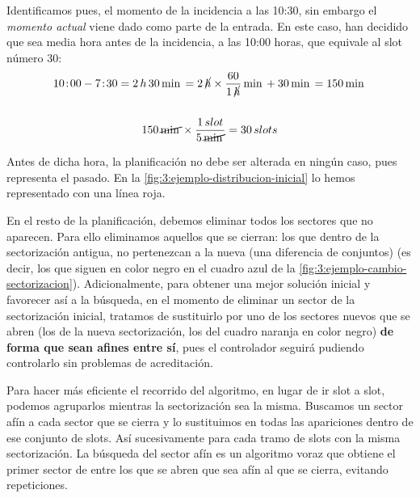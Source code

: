 Identificamos pues, el momento de la incidencia a las 10:30, sin embargo el \textit{momento actual} viene dado como parte de la entrada. En este caso, han decidido que sea media hora antes de la incidencia, a las 10:00 horas, que equivale al slot número 30:
\begin{gather*}
10\!:\!00 - 7\!:\!30 = 2 \,h \,30 \,\min = 2 \, \cancel{h} \times \frac{60}{1 \,\cancel{h}}\,\min + 30\,\min = 150\,\min\\\\
150 \,\cancel{\min} \times \frac{1\,slot}{5\,\cancel{\min}} = 30\,slots
\end{gather*}

Antes de dicha hora, la planificación no debe ser alterada en ningún caso, pues representa el pasado. En la 
\autoref{fig:3:ejemplo-distribucion-inicial} lo hemos representado con una línea roja. 

En el resto de la planificación, debemos eliminar todos los sectores que no aparecen. Para ello eliminamos aquellos que se cierran: los que dentro de la sectorización antigua, no pertenezcan a la nueva (una diferencia de conjuntos) (es decir, los que siguen en color negro en el cuadro azul de la \autoref{fig:3:ejemplo-cambio-sectorizacion}). 
Adicionalmente, para obtener una mejor solución inicial y favorecer así a la búsqueda, en el momento de eliminar un sector de la sectorización inicial, tratamos de sustituirlo por uno de los sectores nuevos que se abren (los de la nueva sectorización, los del cuadro naranja en color negro) \textbf{de forma que sean afines entre sí}, pues el controlador seguirá pudiendo controlarlo sin problemas de acreditación.

Para hacer más eficiente el recorrido del algoritmo, en lugar de ir slot a slot, podemos agruparlos mientras la sectorización sea la misma. Buscamos un sector afín a cada sector que se cierra y lo sustituimos en todas las apariciones dentro de ese conjunto de slots. Así sucesivamente para cada tramo de slots con la misma sectorización. 
La búsqueda del sector afín es un algoritmo voraz que obtiene el primer sector de entre los que se abren que sea afín al que se cierra, evitando repeticiones.

